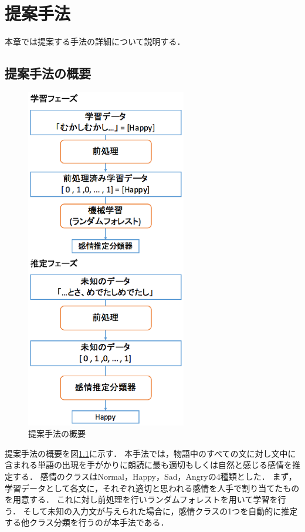 \chapter{提案手法}

本章では提案する手法の詳細について説明する．

\section{提案手法の概要}
\begin{figure}[ht]
  \begin{center}
    \includegraphics[clip,width=7.0cm]{fig/method-2.eps}
    \caption{提案手法の概要}
    \label{fig:method}
  \end{center}
\end{figure}

提案手法の概要を図\ref{fig:method}に示す．
本手法では，物語中のすべての文に対し文中に含まれる単語の出現を手がかりに朗読に最も適切もしくは自然と感じる感情を推定する．
感情のクラスはNormal，Happy，Sad，Angryの4種類とした．
まず，学習データとして各文に，それぞれ適切と思われる感情を人手で割り当てたものを用意する．
これに対し前処理を行いランダムフォレストを用いて学習を行う．
そして未知の入力文が与えられた場合に，感情クラスの1つを自動的に推定する他クラス分類を行うのが本手法である．

